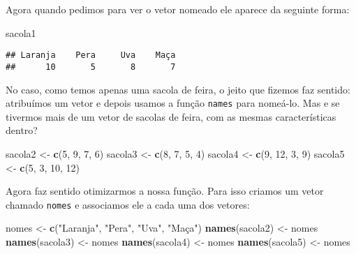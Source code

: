 \documentclass[]{book}
\newenvironment{Shaded}{\begin{snugshade}}{\end{snugshade}}
\newcommand{\DecValTok}[1]{\textcolor[rgb]{0.00,0.00,0.81}{#1}}
\newcommand{\KeywordTok}[1]{\textcolor[rgb]{0.13,0.29,0.53}{\textbf{#1}}}
\newcommand{\NormalTok}[1]{#1}
\newcommand{\StringTok}[1]{\textcolor[rgb]{0.31,0.60,0.02}{#1}}
\theoremstyle{definition}
\theoremstyle{definition}
\theoremstyle{definition}
\theoremstyle{remark}
\begin{document}
Agora quando pedimos para ver o vetor nomeado ele aparece da seguinte forma:

\begin{Shaded}
\begin{Highlighting}[]
\NormalTok{sacola1}
\end{Highlighting}
\end{Shaded}

\begin{verbatim}
## Laranja    Pera     Uva    Maça 
##      10       5       8       7
\end{verbatim}

No caso, como temos apenas uma sacola de feira, o jeito que fizemos faz sentido: atribuímos um vetor e depois usamos a função \texttt{names} para nomeá-lo. Mas e se tivermos mais de um vetor de sacolas de feira, com as mesmas características dentro?

\begin{Shaded}
\begin{Highlighting}[]
\NormalTok{sacola2 <-}\StringTok{ }\KeywordTok{c}\NormalTok{(}\DecValTok{5}\NormalTok{, }\DecValTok{9}\NormalTok{, }\DecValTok{7}\NormalTok{, }\DecValTok{6}\NormalTok{)}
\NormalTok{sacola3 <-}\StringTok{ }\KeywordTok{c}\NormalTok{(}\DecValTok{8}\NormalTok{, }\DecValTok{7}\NormalTok{, }\DecValTok{5}\NormalTok{, }\DecValTok{4}\NormalTok{)}
\NormalTok{sacola4 <-}\StringTok{ }\KeywordTok{c}\NormalTok{(}\DecValTok{9}\NormalTok{, }\DecValTok{12}\NormalTok{, }\DecValTok{3}\NormalTok{, }\DecValTok{9}\NormalTok{)}
\NormalTok{sacola5 <-}\StringTok{ }\KeywordTok{c}\NormalTok{(}\DecValTok{5}\NormalTok{, }\DecValTok{3}\NormalTok{, }\DecValTok{10}\NormalTok{, }\DecValTok{12}\NormalTok{)}
\end{Highlighting}
\end{Shaded}

Agora faz sentido otimizarmos a nossa função. Para isso criamos um vetor chamado \texttt{nomes} e associamos ele a cada uma dos vetores:

\begin{Shaded}
\begin{Highlighting}[]
\NormalTok{nomes <-}\StringTok{ }\KeywordTok{c}\NormalTok{(}\StringTok{"Laranja"}\NormalTok{, }\StringTok{"Pera"}\NormalTok{, }\StringTok{"Uva"}\NormalTok{, }\StringTok{"Maça"}\NormalTok{)}
\KeywordTok{names}\NormalTok{(sacola2) <-}\StringTok{ }\NormalTok{nomes}
\KeywordTok{names}\NormalTok{(sacola3) <-}\StringTok{ }\NormalTok{nomes}
\KeywordTok{names}\NormalTok{(sacola4) <-}\StringTok{ }\NormalTok{nomes}
\KeywordTok{names}\NormalTok{(sacola5) <-}\StringTok{ }\NormalTok{nomes}
\end{Highlighting}
\end{Shaded}
\end{document}
